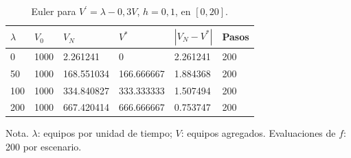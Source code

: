 \begin{table}[H]\centering\small\setlength{\tabcolsep}{4pt}
\caption{Euler para $V^{\prime}=\lambda-0,3V$, $h=0,1$, en $[0,20]$.}\label{tab:extendido}
\begin{tabular}{llllll}
\toprule
$\lambda$ & $V_0$ & $V_N$ & $V^*$ & $|V_N-V^*|$ & Pasos\\
\midrule
0 & 1000 & 2.261241 & 0 & 2.261241 & 200\\
50 & 1000 & 168.551034 & 166.666667 & 1.884368 & 200\\
100 & 1000 & 334.840827 & 333.333333 & 1.507494 & 200\\
200 & 1000 & 667.420414 & 666.666667 & 0.753747 & 200\\
\bottomrule\end{tabular}
\end{table}
{\footnotesize Nota. $\lambda$: equipos por unidad de tiempo; $V$: equipos agregados. Evaluaciones de $f$: 200 por escenario.}
